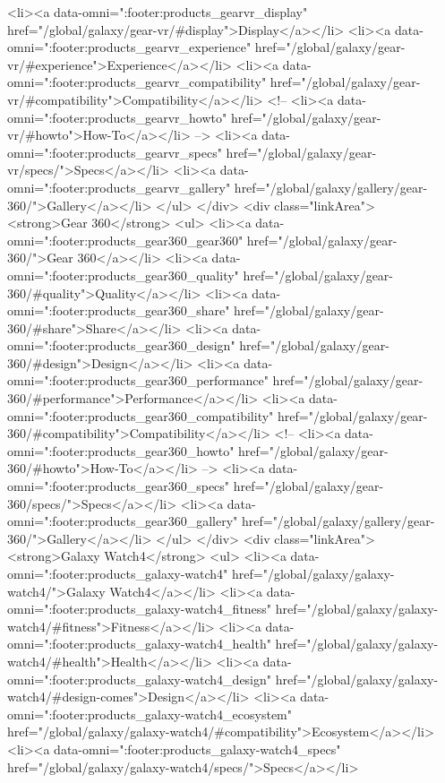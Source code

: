 {{{{{{{{{{{{{{{{{{{{{{{{{{{{{{{{{{{{{{{{{{{{{{{{{{{{{				<li><a data-omni=":footer:products_gearvr_display" href="/global/galaxy/gear-vr/#display">Display</a></li>
				<li><a data-omni=":footer:products_gearvr_experience" href="/global/galaxy/gear-vr/#experience">Experience</a></li>
				<li><a data-omni=":footer:products_gearvr_compatibility" href="/global/galaxy/gear-vr/#compatibility">Compatibility</a></li>
				<!-- <li><a data-omni=":footer:products_gearvr_howto" href="/global/galaxy/gear-vr/#howto">How-To</a></li> -->
				<li><a data-omni=":footer:products_gearvr_specs" href="/global/galaxy/gear-vr/specs/">Specs</a></li>
				<li><a data-omni=":footer:products_gearvr_gallery" href="/global/galaxy/gallery/gear-360/">Gallery</a></li>
			</ul>
		</div>
		<div class="linkArea">
			<strong>Gear 360</strong>
			<ul>
				<li><a data-omni=":footer:products_gear360_gear360" href="/global/galaxy/gear-360/">Gear 360</a></li>
				<li><a data-omni=":footer:products_gear360_quality" href="/global/galaxy/gear-360/#quality">Quality</a></li>
				<li><a data-omni=":footer:products_gear360_share" href="/global/galaxy/gear-360/#share">Share</a></li>
				<li><a data-omni=":footer:products_gear360_design" href="/global/galaxy/gear-360/#design">Design</a></li>
				<li><a data-omni=":footer:products_gear360_performance" href="/global/galaxy/gear-360/#performance">Performance</a></li>
				<li><a data-omni=":footer:products_gear360_compatibility" href="/global/galaxy/gear-360/#compatibility">Compatibility</a></li>
				<!-- <li><a data-omni=":footer:products_gear360_howto" href="/global/galaxy/gear-360/#howto">How-To</a></li> -->
				<li><a data-omni=":footer:products_gear360_specs" href="/global/galaxy/gear-360/specs/">Specs</a></li>
				<li><a data-omni=":footer:products_gear360_gallery" href="/global/galaxy/gallery/gear-360/">Gallery</a></li>
			</ul>
		</div>
		<div class="linkArea">
			<strong>Galaxy Watch4</strong>
			<ul>
				<li><a data-omni=":footer:products_galaxy-watch4"  href="/global/galaxy/galaxy-watch4/">Galaxy Watch4</a></li>
				<li><a data-omni=":footer:products_galaxy-watch4_fitness" href="/global/galaxy/galaxy-watch4/#fitness">Fitness</a></li>
				<li><a data-omni=":footer:products_galaxy-watch4_health" href="/global/galaxy/galaxy-watch4/#health">Health</a></li>
				<li><a data-omni=":footer:products_galaxy-watch4_design" href="/global/galaxy/galaxy-watch4/#design-comes">Design</a></li>
				<li><a data-omni=":footer:products_galaxy-watch4_ecosystem" href="/global/galaxy/galaxy-watch4/#compatibility">Ecosystem</a></li>
				<li><a data-omni=":footer:products_galaxy-watch4_specs" href="/global/galaxy/galaxy-watch4/specs/">Specs</a></li>
}}}}}}}}}}}}}}}}}}}}}}}}}}}}}}}}}}}}}}}}}}}}}}}}}}}}}
